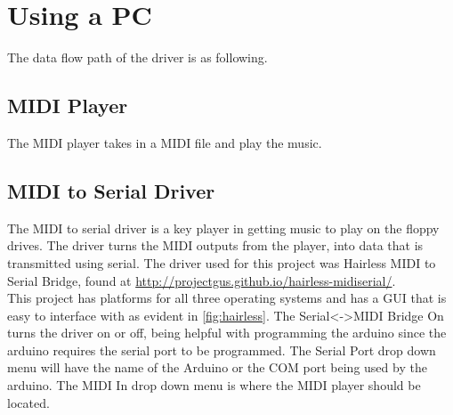 \documentclass[11pt, a4paper]{report}
\begin{document}
\section{Using a PC}

The data flow path of the driver is as following. 

\begin{center}
\end{center}


\subsection{MIDI Player}

The MIDI player takes in a MIDI file and play the music. 

\subsection{MIDI to Serial Driver}

The MIDI to serial driver is a key player in getting music to play on the floppy drives. The driver turns the MIDI outputs from the player, into data that is transmitted using serial. The driver used for this project was Hairless MIDI to Serial Bridge, found at \url{http://projectgus.github.io/hairless-midiserial/}. \\

This project has platforms for all three operating systems and has a GUI that is easy to interface with as evident in \ref{fig:hairless}. The Serial<->MIDI Bridge On turns the driver on or off, being helpful with programming the arduino since the arduino requires the serial port to be programmed. The Serial Port drop down menu will have the name of the Arduino or the COM port being used by the arduino. The MIDI In drop down menu is where the MIDI player should be located. \\
\end{document}
